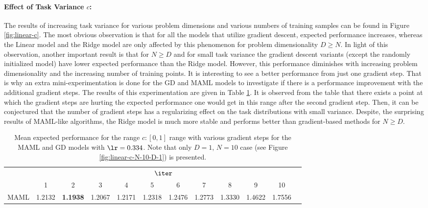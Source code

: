 \paragraph{Effect of Task Variance $c$:} The results of increasing task variance for various problem dimensions and various numbers of training samples can be found in Figure \ref{fig:linear-c}. The most obvious observation is that for all the models that utilize gradient descent, expected performance increases, whereas the Linear model and the Ridge model are only affected by this phenomenon for problem dimensionality $D\geq N$. In light of this observation, another important result is that for $N\geq D$ and for small task variance the gradient descent variants (except the randomly initialized model) have lower expected performance than the Ridge model. However, this performance diminishes with increasing problem dimensionality and the increasing number of training points. It is interesting to see a better performance from just one gradient step. That is why an extra mini-experimentation is done for the GD and MAML models to investigate if there is a performance improvement with the additional gradient steps. The results of this experimentation are given in Table \ref{tab:zoom}. It is observed from the table that there exists a point at which the gradient steps are hurting the expected performance one would get in this range after the second gradient step. Then, it can be conjectured that the number of gradient steps has a regularizing effect on the task distributions with small variance. Despite, the surprising results of MAML-like algorithms, the Ridge model is much more stable and performs better than gradient-based methods for $N\geq D$.

\begin{table}
  \centering
  \caption{Mean expected performance for the range $c:[0,1]$ range with various gradient steps for the MAML and GD models with $\lr=0.334$. Note that only $D=1$, $N=10$ case (see Figure \ref{fig:linear-c-N-10-D-1}) is presented.}\label{tab:zoom}
  \begin{tabular}{c|c|c|c|c|c|c|c|c|c|c|c|}
    \cline{2-11}
     & \multicolumn{10}{|c|}{$\iter$}\\
    \cline{2-11}
     & 1 & 2 & 3 & 4 & 5 & 6 & 7 & 8 & 9 & 10\\
    \hline
    \multicolumn{1}{|c|}{MAML} & 1.2132 & \textbf{1.1938} & 1.2067 & 1.2171 & 1.2318 & 1.2476 & 1.2773 & 1.3330 & 1.4622 & 1.7556  \\
    \hline
    \end{tabular}
\end{table}

